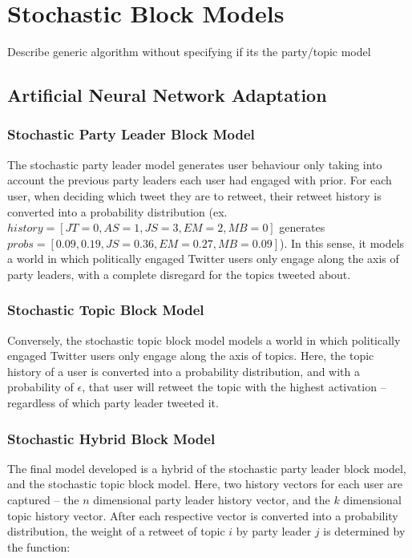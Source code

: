 \section{Stochastic Block Models}\label{sec:SBMs}

Describe generic algorithm without specifying if its the party/topic model

\subsection{Artificial Neural Network Adaptation}\label{sec:ANNAdaptation}

\subsubsection{Stochastic Party Leader Block Model}\label{sec:SPLBM}

The stochastic party leader model generates user behaviour only taking into
account the previous party leaders each user had engaged with prior. For each
user, when deciding which tweet they are to retweet, their retweet history is
converted into a probability distribution (ex.\
$history=[JT=0,AS=1,JS=3,EM=2,MB=0]$ generates
$probs=[0.09,0.19,JS=0.36,EM=0.27,MB=0.09]$). In this sense, it models a world
in which politically engaged Twitter users only engage along the axis of party
leaders, with a complete disregard for the topics tweeted about.

\subsubsection{Stochastic Topic Block Model}\label{sec:STBM}

Conversely, the stochastic topic block model models a world in which politically
engaged Twitter users only engage along the axis of topics. Here, the topic
history of a user is converted into a probability distribution, and with a
probability of $\epsilon$, that user will retweet the topic with the highest
activation -- regardless of which party leader tweeted it. 

\subsubsection{Stochastic Hybrid Block Model}\label{sec:SHBM}

The final model developed is a hybrid of the stochastic party leader block
model, and the stochastic topic block model. Here, two history vectors for each
user are captured -- the $n$ dimensional party leader history vector, and the
$k$ dimensional topic history vector. After each respective vector is converted
into a probability distribution, the weight of a retweet of
topic $i$ by party leader $j$ is determined by the function:

